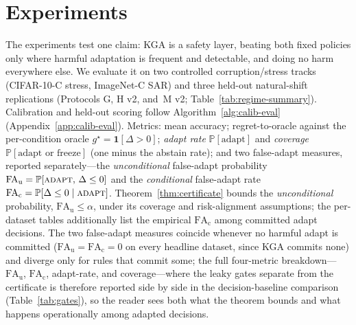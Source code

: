 \documentclass[conference]{IEEEtran}
\theoremstyle{plain}
\theoremstyle{definition}
\theoremstyle{remark}
\renewcommand{\Pr}{\mathbb{P}}
\begin{document}
\section{Experiments}\label{sec:exp}
The experiments test one claim: \textsc{KGA} is a safety layer, beating both fixed policies only
where harmful adaptation is frequent and detectable, and doing no harm everywhere else. We evaluate
it on two controlled corruption/stress tracks (CIFAR-10-C stress, ImageNet-C SAR) and three held-out
natural-shift replications (Protocols G, H v2, and~M v2; Table~\ref{tab:regime-summary}). Calibration
and held-out scoring follow Algorithm~\ref{alg:calib-eval} (Appendix~\ref{app:calib-eval}). Metrics: mean accuracy; regret-to-oracle against the per-condition oracle
$g^\star=\mathbf1[\Delta>0]$; \emph{adapt rate} $\Pr[\text{adapt}]$ and \emph{coverage}
$\Pr[\text{adapt or freeze}]$ (one minus the abstain rate); and two false-adapt measures, reported
separately---the \emph{unconditional} false-adapt probability
$\mathrm{FA}_{\mathrm u}=\Pr[\textsc{adapt},\,\Delta\le0]$ and the \emph{conditional} false-adapt
rate $\mathrm{FA}_{\mathrm c}=\Pr[\Delta\le0\mid\textsc{adapt}]$. Theorem~\ref{thm:certificate} bounds the
\emph{unconditional} probability, $\mathrm{FA}_{\mathrm u}\le\alpha$, under its coverage and
risk-alignment assumptions; the per-dataset tables additionally list the empirical
$\mathrm{FA}_{\mathrm c}$ among committed adapt decisions. The two false-adapt measures coincide
whenever no harmful adapt is committed ($\mathrm{FA}_{\mathrm u}{=}\mathrm{FA}_{\mathrm c}{=}0$ on
every headline dataset, since \textsc{KGA} commits none) and diverge only for rules that commit some;
the full four-metric breakdown---$\mathrm{FA}_{\mathrm u}$, $\mathrm{FA}_{\mathrm c}$, adapt-rate, and
coverage---where the leaky gates separate from the certificate is therefore reported side by side in
the decision-baseline comparison (Table~\ref{tab:gates}), so the reader sees both what the theorem
bounds and what happens operationally among adapted decisions.
\end{document}
